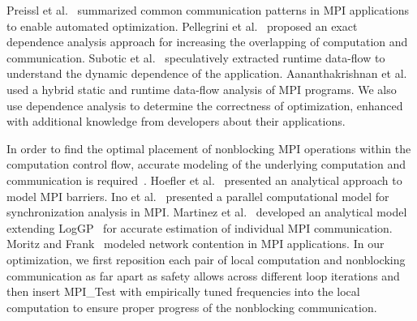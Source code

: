 Preissl et al.~\cite{preissl:tms10} summarized common communication
patterns in MPI applications to enable automated optimization.
Pellegrini et al.~\cite{pellegrini:eurompi12} proposed an exact
dependence analysis approach for increasing the overlapping of
computation and communication.  Subotic et al.~\cite{subotic:hipeac08}
speculatively extracted runtime data-flow to understand the dynamic
dependence of the application.  Aananthakrishnan et
al.~\cite{aananthakrishnan:ics13} used a hybrid static and runtime
data-flow analysis of MPI programs.  We also use dependence analysis
to determine the correctness of optimization, enhanced with additional
knowledge from developers about their applications.

In order to find the optimal placement of nonblocking MPI operations
within the computation control flow, accurate modeling of the
underlying computation and communication is
required~\cite{brightwell:ics04}.  Hoefler et
al.~\cite{hoefler:icppw05} presented an analytical approach to model
MPI barriers.  Ino et al.~\cite{ino:ppopp2001} presented a parallel
computational model for synchronization analysis in MPI.  Martinez et
al.~\cite{martinez:ipdps09} developed an analytical model extending
LogGP~\cite{loggp} for accurate estimation of individual MPI
communication.  Moritz and Frank~\cite{moritz:tpds01} modeled network
contention in MPI applications.  In our optimization, we first
reposition each pair of local computation and nonblocking
communication as far apart as safety allows across different loop
iterations and then insert MPI\_Test with empirically tuned frequencies
into the local computation to ensure proper progress of the
nonblocking communication.
